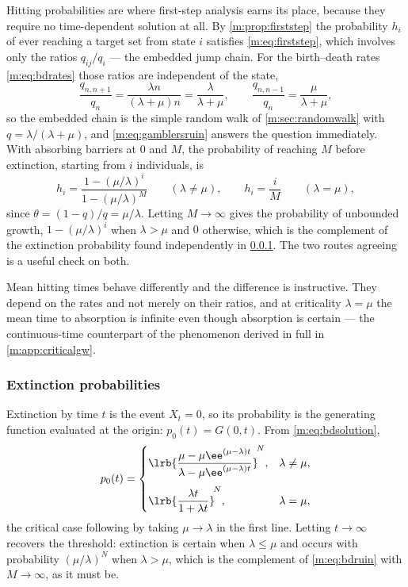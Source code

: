 Hitting probabilities are where first-step analysis earns its place, because they
require no time-dependent solution at all. By \cref{m:prop:firststep} the
probability $h_i$ of ever reaching a target set from state $i$ satisfies
\cref{m:eq:firststep}, which involves only the ratios $q_{ij}/q_i$ --- the embedded
jump chain. For the birth--death rates \cref{m:eq:bdrates} those ratios are
independent of the state,
\begin{equation}
\label{m:eq:bdjumpratios}
\frac{q_{n,n+1}}{q_n} = \frac{\lambda n}{(\lambda+\mu)n} = \frac{\lambda}{\lambda+\mu},
\qquad
\frac{q_{n,n-1}}{q_n} = \frac{\mu}{\lambda+\mu},
\end{equation}
so the embedded chain is the simple random walk of \cref{m:sec:randomwalk} with
$q=\lambda/(\lambda+\mu)$, and \cref{m:eq:gamblersruin} answers the question
immediately. With absorbing barriers at $0$ and $M$, the probability of reaching
$M$ before extinction, starting from $i$ individuals, is
\begin{equation}
\label{m:eq:bdruin}
h_i = \frac{1-(\mu/\lambda)^i}{1-(\mu/\lambda)^M}
\qquad(\lambda\neq\mu),
\qquad
h_i = \frac{i}{M}
\qquad(\lambda=\mu),
\end{equation}
since $\theta = (1-q)/q = \mu/\lambda$. Letting $M\to\infty$ gives the probability
of unbounded growth, $1-(\mu/\lambda)^i$ when $\lambda>\mu$ and $0$ otherwise,
which is the complement of the extinction probability found independently in
\cref{m:sec:extinctionprob}. The two routes agreeing is a useful check on both.

Mean hitting times behave differently and the difference is instructive. They
depend on the rates and not merely on their ratios, and at criticality
$\lambda=\mu$ the mean time to absorption is infinite even though absorption is
certain --- the continuous-time counterpart of the phenomenon derived in full in
\cref{m:app:criticalgw}.

\subsubsection{Extinction probabilities}
\label{m:sec:extinctionprob}

Extinction by time $t$ is the event $X_t=0$, so its probability is the generating
function evaluated at the origin: $p_0(t)=G(0,t)$. From \cref{m:eq:bdsolution},
\begin{equation}
\label{m:eq:p0t}
p_0(t) =
\begin{cases}
\displaystyle\lrb{\frac{\mu-\mu\ee^{(\mu-\lambda)t}}{\lambda-\mu\ee^{(\mu-\lambda)t}}}^{\!N},
& \lambda\neq\mu,\\[14pt]
\displaystyle\lrb{\frac{\lambda t}{1+\lambda t}}^{\!N},
& \lambda=\mu,
\end{cases}
\end{equation}
the critical case following by taking $\mu\to\lambda$ in the first line. Letting
$t\to\infty$ recovers the threshold: extinction is certain when $\lambda\le\mu$ and
occurs with probability $(\mu/\lambda)^N$ when $\lambda>\mu$, which is the
complement of \cref{m:eq:bdruin} with $M\to\infty$, as it must be.

